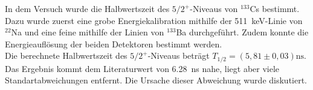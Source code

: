 In dem Versuch wurde die Halbwertszeit des $5/2^+$-Niveaus von $^{133}$Cs bestimmt. Dazu wurde zuerst eine grobe Energiekalibration mithilfe der \SI{511}{keV}-Linie von $^{22}$Na und eine feine mithilfe der Linien von $^{133}$Ba durchgeführt. Zudem konnte die Energieauflösung der beiden Detektoren bestimmt werden.\\
Die berechnete Halbwertszeit des $5/2^+$-Niveaus beträgt $T_{1/2} = (5,81 \pm 0,03) \si{\nano\second}$. Das Ergebnis kommt dem Literaturwert von \SI{6,28}{\nano\second} \cite{cs133} nahe, liegt aber viele Standartabweichungen entfernt. Die Ursache dieser Abweichung wurde diskutiert.  